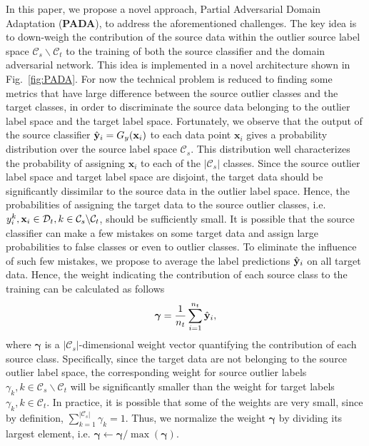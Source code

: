 \documentclass[runningheads]{llncs}
\begin{document}
In this paper, we propose a novel approach, Partial Adversarial Domain Adaptation (\textbf{PADA}), to address the aforementioned challenges. The key idea is to down-weigh the contribution of the source data within the outlier source label space $\mathcal{C}_s \backslash \mathcal{C}_t$ to the training of both the source classifier and the domain adversarial network. This idea is implemented in a novel architecture shown in Fig.~\ref{fig:PADA}. For now the technical problem is reduced to finding some metrics that have large difference between the source outlier classes and the target classes, in order to discriminate the source data belonging to the outlier label space and the target label space. Fortunately, we observe that the output of the source classifier  ${\hat{\bf{y}}}_i = G_y(\mathbf{x}_i)$ to each data point $\mathbf{x}_i$ gives a probability distribution over the source label space $\mathcal{C}_s$. This distribution well characterizes the probability of assigning $\mathbf{x}_i$ to each of the $|\mathcal{C}_s|$ classes. Since the source outlier label space and target label space are disjoint, the target data should be significantly dissimilar to the source data in the outlier label space. Hence, the probabilities of assigning the target data to the source outlier classes, i.e. $y_i^k, {\bf x}_i \in \mathcal{D}_t, k \in \mathcal{C}_s \backslash \mathcal{C}_t$, should be sufficiently small. It is possible that the source classifier can make a few mistakes on some target data and assign large probabilities to false classes or even to outlier classes. To eliminate the influence of such few mistakes, we propose to average the label predictions ${\hat{\bf{y}}}_i$ on all target data. 
Hence, the weight indicating the contribution of each source class to the training can be calculated as follows
\begin{equation}\label{eqn:weight}
    {\bm\gamma} = \frac{1}{n_t}\sum\limits_{i=1}^{n_t}{{\hat{\bf{y}}}_i},
\end{equation}
where ${\bm\gamma}$ is a $|\mathcal{C}_s|$-dimensional weight vector quantifying the contribution of each source class. Specifically, since the target data are not belonging to the source outlier label space, the corresponding weight for source outlier labels ${\gamma}_k, k \in \mathcal{C}_s \backslash \mathcal{C}_t$ will be significantly smaller than the weight for target labels ${\gamma}_k, k \in \mathcal{C}_t$. In practice, it is possible that some of the weights are very small, since by definition, $\sum\nolimits_{k = 1}^{\left| {{\mathcal{C}_s}} \right|} {{\gamma _k}}  = 1$. Thus, we normalize the weight ${\bm\gamma}$ by dividing its largest element, i.e. ${\bm\gamma}  \leftarrow {\bm\gamma} /\max \left( {\bm\gamma}  \right)$. 
\end{document}
